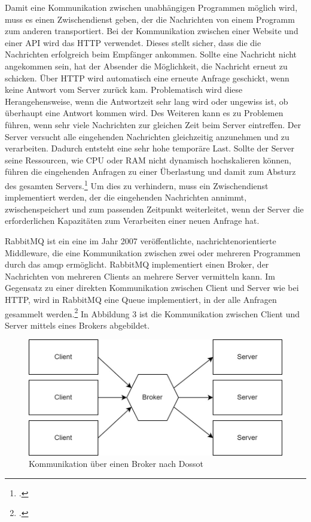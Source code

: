 Damit eine Kommunikation zwischen unabhängigen Programmen möglich wird, muss es einen Zwischendienst geben, der die Nachrichten von einem Programm zum anderen transportiert. Bei der Kommunikation zwischen einer Website und einer API wird das HTTP verwendet. Dieses stellt sicher, dass die die Nachrichten erfolgreich beim Empfänger ankommen. Sollte eine Nachricht nicht angekommen sein, hat der Absender die Möglichkeit, die Nachricht erneut zu schicken. Über HTTP wird automatisch eine erneute Anfrage geschickt, wenn keine Antwort vom Server zurück kam. Problematisch wird diese Herangehensweise, wenn die Antwortzeit sehr lang wird oder ungewiss ist, ob überhaupt eine Antwort kommen wird. Des Weiteren kann es zu Problemen führen, wenn sehr viele Nachrichten zur gleichen Zeit beim Server eintreffen. Der Server versucht alle eingehenden Nachrichten gleichzeitig anzunehmen und zu verarbeiten. Dadurch entsteht eine sehr hohe temporäre Last. Sollte der Server seine Ressourcen, wie CPU oder RAM nicht dynamisch hochskalieren können, führen die eingehenden Anfragen zu einer Überlastung und damit zum Absturz des gesamten Servers.\footcite{hoque2015botnet} Um dies zu verhindern, muss ein Zwischendienst implementiert werden, der die eingehenden Nachrichten annimmt, zwischenspeichert und zum passenden Zeitpunkt weiterleitet, wenn der Server die erforderlichen Kapazitäten zum Verarbeiten einer neuen Anfrage hat.

RabbitMQ ist ein eine im Jahr 2007 veröffentlichte, nachrichtenorientierte Middleware, die eine Kommunikation zwischen zwei oder mehreren Programmen durch das \ac{amqp} ermöglicht. RabbitMQ implementiert einen Broker, der Nachrichten von mehreren Clients an mehrere Server vermitteln kann. Im Gegensatz zu einer direkten Kommunikation zwischen Client und Server wie bei HTTP, wird in RabbitMQ eine Queue implementiert, in der alle Anfragen gesammelt werden.\footcite{JohanssonLovisa2020REBD} In Abbildung 3 ist die Kommunikation zwischen Client und Server mittels eines Brokers abgebildet.
 
\begin{figure}[H]
  \centering
    \includegraphics[width = 12cm]{bilder/Rabbit2}
    \caption{Kommunikation über einen Broker nach Dossot}
\end{figure}

